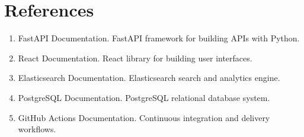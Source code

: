 \documentclass[12pt]{article}
\begin{document}
\section*{References}
\begin{enumerate}[leftmargin=0.7cm]
\item FastAPI Documentation. FastAPI framework for building APIs with Python.
\item React Documentation. React library for building user interfaces.
\item Elasticsearch Documentation. Elasticsearch search and analytics engine.
\item PostgreSQL Documentation. PostgreSQL relational database system.
\item GitHub Actions Documentation. Continuous integration and delivery workflows.
\end{enumerate}
\end{document}
